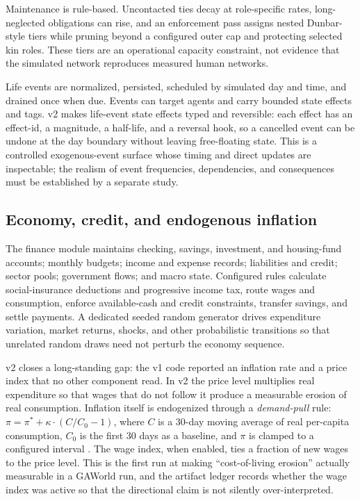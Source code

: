 Maintenance is rule-based.  Uncontacted ties decay at role-specific rates,
long-neglected obligations can rise, and an enforcement pass assigns nested
Dunbar-style tiers while pruning beyond a configured outer cap and protecting
selected kin roles.  These tiers are an operational capacity constraint, not
evidence that the simulated network reproduces measured human networks.

Life events are normalized, persisted, scheduled by simulated day and time,
and drained once when due.  Events can target agents and carry bounded state
effects and tags.  v2 makes life-event state effects typed and reversible:
each effect has an effect-id, a magnitude, a half-life, and a reversal hook,
so a cancelled event can be undone at the day boundary without leaving
free-floating state.  This is a controlled exogenous-event surface whose
timing and direct updates are inspectable; the realism of event frequencies,
dependencies, and consequences must be established by a separate study.

\subsection{Economy, credit, and endogenous inflation}

The finance module maintains checking, savings, investment, and housing-fund
accounts; monthly budgets; income and expense records; liabilities and
credit; sector pools; government flows; and macro state.  Configured rules
calculate social-insurance deductions and progressive income tax, route wages
and consumption, enforce available-cash and credit constraints, transfer
savings, and settle payments.  A dedicated seeded random generator drives
expenditure variation, market returns, shocks, and other probabilistic
transitions so that unrelated random draws need not perturb the economy
sequence.

v2 closes a long-standing gap: the v1 code reported an inflation rate and a
price index that no other component read.  In v2 the price level multiplies
real expenditure so that wages that do not follow it produce a measurable
erosion of real consumption.  Inflation itself is endogenized through a
\emph{demand-pull} rule: $\pi = \pi^{*} + \kappa \cdot (C/C_0 - 1)$, where
$C$ is a 30-day moving average of real per-capita consumption, $C_0$ is the
first 30 days as a baseline, and $\pi$ is clamped to a configured interval
\citep{gaworldinflation}.  The wage index, when enabled, ties a fraction of
new wages to the price level.  This is the first run at making
``cost-of-living erosion'' actually measurable in a GAWorld run, and the
artifact ledger records whether the wage index was active so that the
directional claim is not silently over-interpreted.

